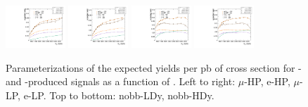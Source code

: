 \begin{figure}[htbp]
  \includegraphics[width=0.2\textwidth]{fig/2Dfit/paramSignalYield_NonVBFSig_mu_HP_nobb_HDy.pdf}
  \includegraphics[width=0.2\textwidth]{fig/2Dfit/paramSignalYield_NonVBFSig_e_HP_nobb_HDy.pdf}
  \includegraphics[width=0.2\textwidth]{fig/2Dfit/paramSignalYield_NonVBFSig_mu_LP_nobb_HDy.pdf}
  \includegraphics[width=0.2\textwidth]{fig/2Dfit/paramSignalYield_NonVBFSig_e_LP_nobb_HDy.pdf}\\
  \caption{
    Parameterizations of the expected yields per pb of cross section for \ggF- and \DY-produced signals as a function of \MX.
    Left to right: $\mu$-HP, e-HP, $\mu$-LP, e-LP.
    Top to bottom: nobb-LDy, nobb-HDy.
  }
  \label{fig:YieldParam_NonVBF_Run2}
\end{figure}

